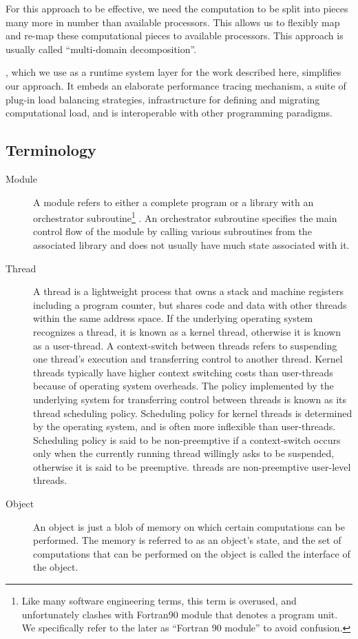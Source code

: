 \documentclass[10pt]{article}
\begin{document}
For this approach to be effective, we need the computation to be split into
pieces many more in number than available processors. This allows us to
flexibly map and re-map these computational pieces to available processors.
This approach is usually called ``multi-domain decomposition''.

\charmpp{}, which we use as a runtime system layer for the work described here,
simplifies our approach. It embeds an elaborate performance tracing mechanism,
a suite of plug-in load balancing strategies, infrastructure for defining and
migrating computational load, and is interoperable with other programming
paradigms.

\subsection{Terminology}

\begin{description}

\item[Module] A module refers to either a complete program or a library with an
orchestrator subroutine\footnote{Like many software engineering terms, this
term is overused, and unfortunately clashes with Fortran90 module that denotes
a program unit. We specifically refer to the later as ``Fortran 90 module'' to
avoid confusion.} . An orchestrator subroutine specifies the main control flow
of the module by calling various subroutines from the associated library and
does not usually have much state associated with it.

\item[Thread] A thread is a lightweight process that owns a stack and machine
registers including a program counter, but shares code and data with other
threads within the same address space. If the underlying operating system
recognizes a thread, it is known as a kernel thread, otherwise it is known as a
user-thread. A context-switch between threads refers to suspending one thread's
execution and transferring control to another thread. Kernel threads typically
have higher context switching costs than user-threads because of operating
system overheads. The policy implemented by the underlying system for
transferring control between threads is known as its thread scheduling policy.
Scheduling policy for kernel threads is determined by the operating system, and
is often more inflexible than user-threads. Scheduling policy is said to be
non-preemptive if a context-switch occurs only when the currently running
thread willingly asks to be suspended, otherwise it is said to be preemptive.
\ampi{} threads are non-preemptive user-level threads.

\item[Object] An object is just a blob of memory on which certain computations
can be performed. The memory is referred to as an object's state, and the set
of computations that can be performed on the object is called the interface of
the object.

\end{description}
\end{document}
